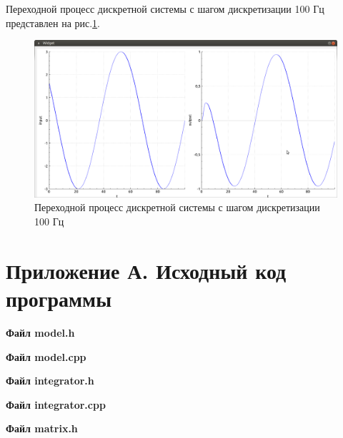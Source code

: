 \documentclass[14pt,a4paper]{extreport}
\begin{document}
Переходной процесс дискретной системы с шагом дискретизации 
100 Гц представлен на рис.\ref{fig:discrete100}.

\begin{figure}[h]
    \centering
    \includegraphics[width=160mm]{img/100hz.png}
    \caption{Переходной процесс дискретной системы 
    с шагом дискретизации 100 Гц}
    \label{fig:discrete100}
\end{figure}

\newpage
\chapter*{Приложение А. Исходный код программы}

\textbf{Файл model.h}
\begin{alltt}
    
\end{alltt}

\textbf{Файл model.cpp}
\begin{alltt}
    
\end{alltt}

\textbf{Файл integrator.h}
\begin{alltt}
    
\end{alltt}

\textbf{Файл integrator.cpp}
\begin{alltt}
    
\end{alltt}

\textbf{Файл matrix.h}
\begin{alltt}
    
\end{alltt}
\end{document}
